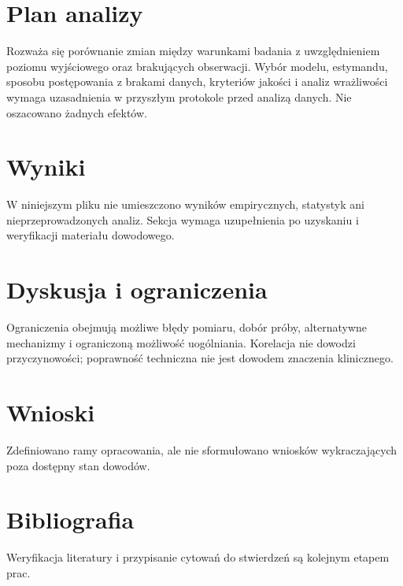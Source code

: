 \documentclass[11pt,a4paper]{article}
\begin{document}
\section{Plan analizy}

Rozważa się porównanie zmian między warunkami badania z uwzględnieniem poziomu wyjściowego oraz brakujących obserwacji. Wybór modelu, estymandu, sposobu postępowania z brakami danych, kryteriów jakości i analiz wrażliwości wymaga uzasadnienia w przyszłym protokole przed analizą danych. Nie oszacowano żadnych efektów.

\section{Wyniki}

W niniejszym pliku nie umieszczono wyników empirycznych, statystyk ani nieprzeprowadzonych analiz. Sekcja wymaga uzupełnienia po uzyskaniu i weryfikacji materiału dowodowego.

\section{Dyskusja i ograniczenia}

Ograniczenia obejmują możliwe błędy pomiaru, dobór próby, alternatywne mechanizmy i ograniczoną możliwość uogólniania. Korelacja nie dowodzi przyczynowości; poprawność techniczna nie jest dowodem znaczenia klinicznego.

\section{Wnioski}

Zdefiniowano ramy opracowania, ale nie sformułowano wniosków wykraczających poza dostępny stan dowodów.

\section*{Bibliografia}

Weryfikacja literatury i przypisanie cytowań do stwierdzeń są kolejnym etapem prac.
\end{document}
